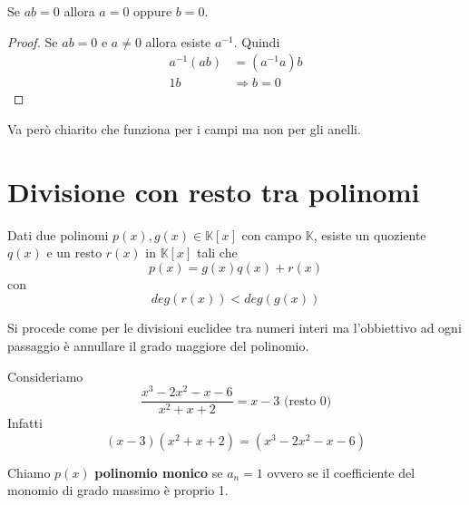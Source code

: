 \begin{theorem}
	Se $ab = 0$ allora $a = 0$ oppure $b = 0$.
	\begin{proof}
		Se $ab = 0$ e $a \neq 0$ allora esiste $a^{-1}$. Quindi
		\begin{equation*}
			\begin{array}{ll}
				a^{-1}(ab) & = (a^{-1}a)b      \\
				1b         & \Rightarrow b = 0
			\end{array}
		\end{equation*}
	\end{proof}
	Va per\`o chiarito che funziona per i campi ma non per gli anelli.
\end{theorem}

\section{Divisione con resto tra polinomi}

\begin{theorem}
	Dati due polinomi $p(x), g(x) \in \mathbb{K}[x]$ con campo $\mathbb{K}$, esiste un
	quoziente $q(x)$ e un resto $r(x)$ in $\mathbb{K}[x]$ tali che
	\begin{equation*}
		p(x) = g(x) q(x) + r(x)
	\end{equation*}
	con
	\begin{equation*}
		deg(r(x)) < deg(g(x))
	\end{equation*}
\end{theorem}

Si procede come per le divisioni euclidee tra numeri interi ma l'obbiettivo ad ogni passaggio
\`e annullare il grado maggiore del polinomio.

\begin{example}
	Consideriamo
	\begin{equation*}
		\frac{x^3 - 2x^2 - x -6}{x^2 + x + 2} = x - 3 \text{ (resto 0)}
	\end{equation*}
	Infatti
	\begin{equation*}
		(x - 3)(x^2 + x + 2) = (x^3 - 2x^2 - x - 6)
	\end{equation*}
\end{example}

\begin{defn}
	Chiamo $p(x)$ \textbf{polinomio monico} se $a_n = 1$ ovvero se il coefficiente del monomio
	di grado massimo \`e proprio 1.
\end{defn}

